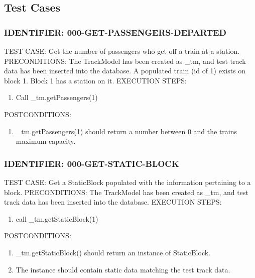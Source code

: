 \documentclass{scrreprt}
\begin{document}
\subsection{Test Cases}

\subsubsection{IDENTIFIER: 000-GET-PASSENGERS-DEPARTED}
TEST CASE: Get the number of passengers who get off a train at a station.
PRECONDITIONS: The TrackModel has been created as _tm, and test track data has been inserted into the database. A populated train (id of 1) exists on block 1. Block 1 has a station on it.
EXECUTION STEPS:
\begin{enumerate}
	\item Call _tm.getPassengers(1)
\end{enumerate}
POSTCONDITIONS:
\begin{enumerate}
	\item _tm.getPassengers(1) should return a number between 0 and the trains maximum capacity.
\end{enumerate}

\subsubsection{IDENTIFIER: 000-GET-STATIC-BLOCK}
TEST CASE: Get a StaticBlock populated with the information pertaining to a block.
PRECONDITIONS: The TrackModel has been created as _tm, and test track data has been inserted into the database.
EXECUTION STEPS:
\begin{enumerate}
	\item call _tm.getStaticBlock(1)
\end{enumerate}
POSTCONDITIONS:
\begin{enumerate}
	\item _tm.getStaticBlock() should return an instance of StaticBlock.
	\item The instance should contain static data matching the test track data.
\end{enumerate}
\end{document}
